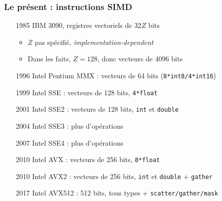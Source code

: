 \documentclass[xcolor={x11names,svgnames}]{beamer}
\begin{document}
\begin{frame}
  \frametitle{Le présent : instructions SIMD}

  \begin{enumerate}
  \item[1985] IBM 3090, registres vectoriels de $32 Z$ bits
    \begin{itemize}
    \item $Z$ \alert{pas spécifié}, \textit{implementation-dependent}
    \item Dans les faits, $Z=128$, donc vecteurs de 4096 bits
    \end{itemize}
  \end{enumerate}

  \medskip
    \begin{overlayarea}{\textwidth}{6cm}
    \pause
    \pause

    \begin{enumerate}  
    \item[1996] Intel Pentium MMX : vecteurs de 64 bits (\texttt{8*int8/4*int16})
      \pause
    \item[1999] Intel SSE : vecteurs de 128 bits, \texttt{4*float}
    \item[2001] Intel SSE2 : vecteurs de 128 bits, \texttt{int} et \texttt{double}
    \item[2004] Intel SSE3 : plus d'opérations
    \item[2007] Intel SSE4 : plus d'opérations
    \item[2010] Intel AVX : vecteurs de 256 bits, \texttt{8*float}
    \item[2010] Intel AVX2 : vecteurs de 256 bits, \texttt{int} et \texttt{double} + \texttt{gather}
    \item[2017] Intel AVX512 : 512 bits, tous types + \texttt{scatter/gather/mask}
  \end{enumerate}
\end{overlayarea}


\end{frame}
\end{document}
